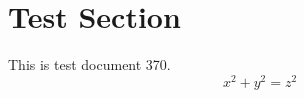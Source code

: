 \documentclass{article}
\begin{document}
\section{Test Section}
This is test document 370.
\begin{equation}
x^2 + y^2 = z^2
\end{equation}
\end{document}
